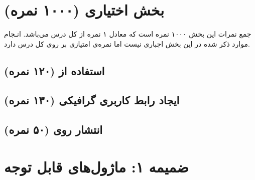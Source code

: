 \documentclass[a4paper]{report}
\begin{document}
\chapter{بخش اختیاری (۱۰۰۰ نمره)}
\begin{center}
    \begin{warningbox}
        \Large
        جمع نمرات این بخش ۱۰۰۰ نمره است که معادل ۱ نمره از کل درس می‌باشد.
        انـجام موارد ذکر شده در این بخش اجباری نیست اما نمره‌ی امتیازی بر روی کل درس دارد.
    \end{warningbox}
\end{center}

\section{استفاده از  (۱۲۰ نمره)}

\section{ایجاد رابط کاربری گرافیکی (۱۳۰ نمره)}

\section{انتشار روی  (۵۰ نمره)}


\chapter{ضمیمه ۱: ماژول‌های قابل توجه}
\end{document}
